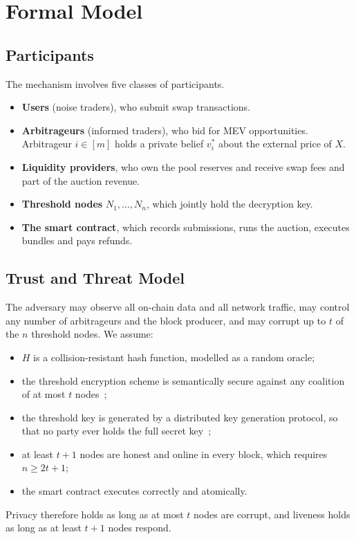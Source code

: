 \section{Formal Model}

\subsection{Participants}

The mechanism involves five classes of participants.
\begin{itemize}
    \item \textbf{Users} (noise traders), who submit swap transactions.
    \item \textbf{Arbitrageurs} (informed traders), who bid for MEV opportunities. Arbitrageur $i\in[m]$ holds a private belief $v_i^{*}$ about the external price of $X$.
    \item \textbf{Liquidity providers}, who own the pool reserves and receive swap fees and part of the auction revenue.
    \item \textbf{Threshold nodes} $N_1,\dots,N_n$, which jointly hold the decryption key.
    \item \textbf{The smart contract}, which records submissions, runs the auction, executes bundles and pays refunds.
\end{itemize}

\subsection{Trust and Threat Model}

The adversary may observe all on-chain data and all network traffic, may control any number of arbitrageurs and the block producer, and may corrupt up to $t$ of the $n$ threshold nodes. We assume:
\begin{itemize}
    \item $H$ is a collision-resistant hash function, modelled as a random oracle;
    \item the threshold encryption scheme is semantically secure against any coalition of at most $t$ nodes~\cite{desmedt1989threshold};
    \item the threshold key is generated by a distributed key generation protocol, so that no party ever holds the full secret key~\cite{pedersen1991threshold};
    \item at least $t+1$ nodes are honest and online in every block, which requires $n\geq 2t+1$;
    \item the smart contract executes correctly and atomically.
\end{itemize}
Privacy therefore holds as long as at most $t$ nodes are corrupt, and liveness holds as long as at least $t+1$ nodes respond.

